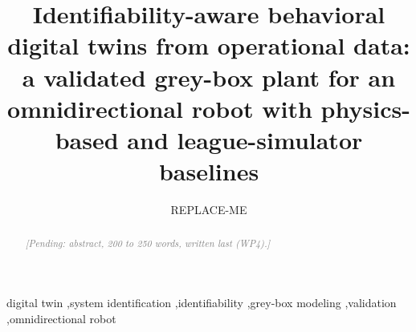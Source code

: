 \documentclass[preprint,12pt]{elsarticle}
\newcommand{\pending}[1]{\textcolor{gray}{\emph{[Pending: #1]}}}
\begin{document}
\begin{frontmatter}

\title{Identifiability-aware behavioral digital twins from operational data: a validated grey-box plant for an omnidirectional robot with physics-based and league-simulator baselines}

\author[cin]{REPLACE-ME}

\begin{abstract}
\pending{abstract, 200 to 250 words, written last (WP4).}
\end{abstract}

\begin{keyword}
digital twin \sep system identification \sep identifiability \sep grey-box modeling \sep validation \sep omnidirectional robot
\end{keyword}

\end{frontmatter}

\linenumbers
















\end{document}
